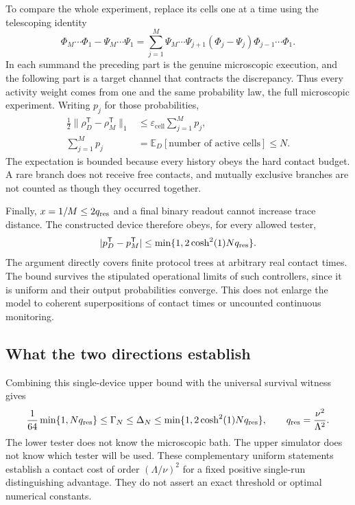 \documentclass[11pt,a4paper]{article}
\numberwithin{equation}{section}
\theoremstyle{remark}
\newcommand{\E}{\mathbb E}
\begin{document}
To compare the whole experiment, replace its cells one at a time using
the telescoping identity
\begin{equation}
 \Phi_{M}\cdots\Phi_1-
 \Psi_{M}\cdots\Psi_1
 =\sum_{j=1}^{M}
 \Psi_{M}\cdots\Psi_{j+1}
 (\Phi_j-\Psi_j)\Phi_{j-1}\cdots\Phi_1.
 \label{sim:hybrid}
\end{equation}
In each summand the preceding part is the genuine microscopic execution,
and the following part is a target channel that contracts the discrepancy.
Thus every activity weight comes from one and the same probability law,
the full microscopic experiment. Writing $p_j$ for those probabilities,
\begin{align}
 \frac12\|\rho_D^{\mathsf T}-\rho_M^{\mathsf T}\|_1
 &\le\varepsilon_{\mathrm{cell}}\sum_{j=1}^{M}p_j,
 \nonumber\\
 \sum_{j=1}^{M}p_j
 &=\E_D[\text{number of active cells}]\le N.
 \label{sim:actual-budget}
\end{align}
The expectation is bounded because every history obeys the hard contact
budget. A rare branch does not receive free contacts, and mutually
exclusive branches are not counted as though they occurred together.

Finally, $x=1/M\le2q_{\rm res}$ and a final binary readout cannot
increase trace distance. The constructed device therefore obeys, for
every allowed tester,
\begin{equation}
 |p_D^{\mathsf T}-p_M^{\mathsf T}|
 \le\min\{1,2\cosh^2(1)Nq_{\rm res}\}.
 \label{sim:global-upper}
\end{equation}
The argument directly covers finite protocol trees at arbitrary real
contact times. The bound survives the stipulated operational limits of
such controllers, since it is uniform and their output probabilities
converge. This does not enlarge the model to coherent superpositions of
contact times or uncounted continuous monitoring.

\subsection{What the two directions establish}
\label{sim:consequences}

Combining this single-device upper bound with the universal survival
witness gives
\begin{equation}
 \frac1{64}\min\{1,Nq_{\rm res}\}\le\Gamma_N\le\Delta_N
 \le\min\{1,2\cosh^2(1)Nq_{\rm res}\},
 \qquad q_{\rm res}=\frac{\nu^2}{\Lambda^2}.
 \label{sim:matched-law}
\end{equation}
The lower tester does not know the microscopic bath. The upper simulator
does not know which tester will be used. These complementary uniform
statements establish a contact cost of order $(\Lambda/\nu)^2$ for
a fixed positive single-run distinguishing advantage. They do not assert
an exact threshold or optimal numerical constants.
\end{document}
